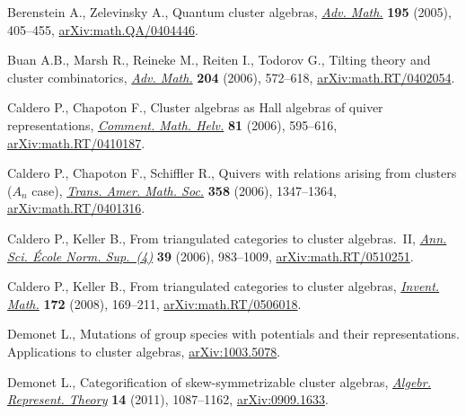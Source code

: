 \documentclass[pdftex]{sigma}
\numberwithin{equation}{section}
\begin{document}
\begin{thebibliography}{99}
\footnotesize\itemsep=0pt

Berenstein A., Zelevinsky A., Quantum cluster algebras, \href{https://doi.org/10.1016/j.aim.2004.08.003}{\textit{Adv. Math.}}
 \textbf{195} (2005), 405--455, \href{https://arxiv.org/abs/math.QA/0404446}{arXiv:math.QA/0404446}.

Buan A.B., Marsh R., Reineke M., Reiten I., Todorov G., Tilting theory and
 cluster combinatorics, \href{https://doi.org/10.1016/j.aim.2005.06.003}{\textit{Adv. Math.}} \textbf{204} (2006), 572--618,
 \href{https://arxiv.org/abs/math.RT/0402054}{arXiv:math.RT/0402054}.

Caldero P., Chapoton F., Cluster algebras as {H}all algebras of quiver
 representations, \href{https://doi.org/10.4171/CMH/65}{\textit{Comment. Math. Helv.}} \textbf{81} (2006), 595--616,
 \href{https://arxiv.org/abs/math.RT/0410187}{arXiv:math.RT/0410187}.

Caldero P., Chapoton F., Schiffler R., Quivers with relations arising from
 clusters ({$A_n$} case), \href{https://doi.org/10.1090/S0002-9947-05-03753-0}{\textit{Trans. Amer. Math. Soc.}} \textbf{358}
 (2006), 1347--1364, \href{https://arxiv.org/abs/math.RT/0401316}{arXiv:math.RT/0401316}.

Caldero P., Keller B., From triangulated categories to cluster algebras.~{II},
 \href{https://doi.org/10.1016/j.ansens.2006.09.003}{\textit{Ann. Sci. \'Ecole Norm. Sup.~(4)}} \textbf{39} (2006), 983--1009,
 \href{https://arxiv.org/abs/math.RT/0510251}{arXiv:math.RT/0510251}.

Caldero P., Keller B., From triangulated categories to cluster algebras,
 \href{https://doi.org/10.1007/s00222-008-0111-4}{\textit{Invent. Math.}} \textbf{172} (2008), 169--211,
 \href{https://arxiv.org/abs/math.RT/0506018}{arXiv:math.RT/0506018}.

Demonet L., Mutations of group species with potentials and their
 representations. Applications to cluster algebras, \href{https://arxiv.org/abs/1003.5078}{arXiv:1003.5078}.

Demonet L., Categorification of skew-symmetrizable cluster algebras,
 \href{https://doi.org/10.1007/s10468-010-9228-4}{\textit{Algebr. Represent. Theory}} \textbf{14} (2011), 1087--1162,
 \href{https://arxiv.org/abs/0909.1633}{arXiv:0909.1633}.


\end{thebibliography}
\end{document}
